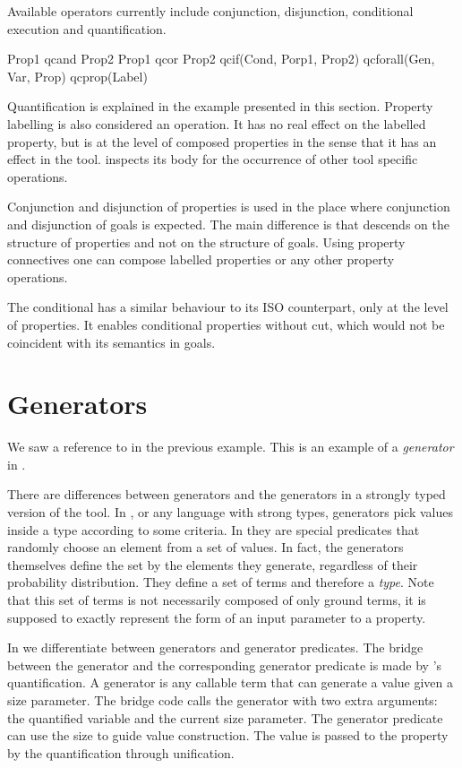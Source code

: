 Available operators currently include conjunction, disjunction,
conditional execution and quantification.
%
\begin{yapcode}
   Prop1 qcand Prop2
   Prop1 qcor Prop2
   qcif(Cond, Porp1, Prop2)
   qcforall(Gen, Var, Prop)
   qcprop(Label)
\end{yapcode}
%
Quantification is explained in the example presented in this section.
%
Property labelling is also considered an operation.
%
It has no real effect on the labelled property, but is at the level of
composed properties in the sense that it has an effect in the tool.
%
\plqc{} inspects its body for the occurrence of other tool specific
operations.


Conjunction and disjunction of properties is used in the place where
conjunction and disjunction of goals is expected.
%
The main difference is that \plqc{} descends on the structure of
properties and not on the structure of goals.
%
Using property connectives one can compose labelled properties or any
other \plqc{} property operations.


The conditional  has a similar behaviour to its ISO
\Prolog{} counterpart, only at the level of \plqc{} properties.
%
It enables conditional properties without cut, which would not be
coincident with its semantics in \Prolog{} goals.


\section{Generators}
\label{sec:generators}

We saw a reference to  in the previous example.
%
This is an example of a \emph{generator} in \plqc{}.



There are  differences between \plqc{} generators and the
generators in a strongly typed version of the tool.
%
In \Haskell{} \QuickCheck{}, or any language with strong types,
generators pick values inside a type according to some criteria.
%
In \plqc{} they are special predicates that randomly choose an element
from a set of values.
%
In fact, the generators themselves define the set by the elements
they generate, regardless of their probability distribution.
%
They define a set of terms and therefore a \emph{type}.
%
Note that this set of terms is not necessarily composed of only ground terms, it
is supposed to exactly represent the form of an input parameter to a
property.


In \plqc{} we differentiate between generators and generator
predicates.
%
The bridge between the generator and the corresponding generator
predicate is made by \plqc{}'s quantification.
%
A generator is any callable term that can generate a value given a
size parameter.
%
The bridge code calls the generator with two extra
arguments: the quantified variable and the current size parameter.
%
The generator predicate can use the size to guide value
construction.
%
The value is passed to the property by the \plqc{} quantification
through unification.



